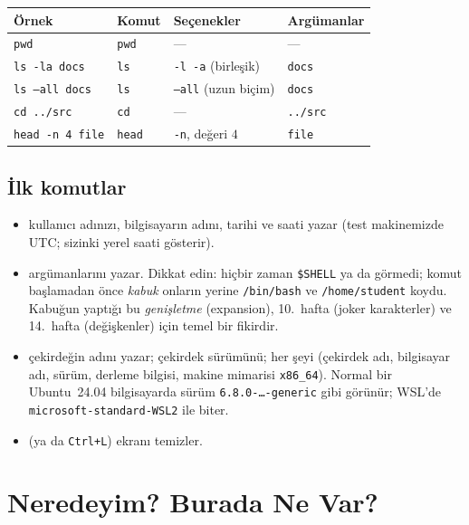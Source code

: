 \begin{center}
\begin{tabular}{l l l l}
\toprule
\textbf{Örnek} & \textbf{Komut} & \textbf{Seçenekler} & \textbf{Argümanlar}\\
\midrule
\texttt{pwd} & \texttt{pwd} & --- & ---\\
\texttt{ls -la docs} & \texttt{ls} & \texttt{-l -a} (birleşik) & \texttt{docs}\\
\texttt{ls --all docs} & \texttt{ls} & \texttt{--all} (uzun biçim) & \texttt{docs}\\
\texttt{cd ../src} & \texttt{cd} & --- & \texttt{../src}\\
\texttt{head -n 4 file} & \texttt{head} & \texttt{-n}, değeri $4$ & \texttt{file}\\
\bottomrule
\end{tabular}
\end{center}

\subsection{İlk komutlar}
\label{sec:first}


\begin{itemize}
  \item {} kullanıcı adınızı,  bilgisayarın adını,  tarihi ve saati yazar (test makinemizde UTC; sizinki yerel saati gösterir).
  \item {} argümanlarını yazar. Dikkat edin:  hiçbir zaman \texttt{\$SHELL} ya da \texttt{\tl} görmedi; komut başlamadan önce \emph{kabuk} onların yerine \texttt{/bin/bash} ve \texttt{/home/student} koydu. Kabuğun yaptığı bu \emph{genişletme} (expansion), 10.\ hafta (joker karakterler) ve 14.\ hafta (değişkenler) için temel bir fikirdir.
  \item {} çekirdeğin adını yazar;  çekirdek sürümünü;  her şeyi (çekirdek adı, bilgisayar adı, sürüm, derleme bilgisi, makine mimarisi \texttt{x86\_64}). Normal bir Ubuntu~24.04 bilgisayarda sürüm \texttt{6.8.0-\ldots-generic} gibi görünür; WSL'de \texttt{microsoft-standard-WSL2} ile biter.
  \item {} (ya da \texttt{Ctrl+L}) ekranı temizler.
\end{itemize}

\section{Neredeyim? Burada Ne Var?}
\label{sec:ls}

